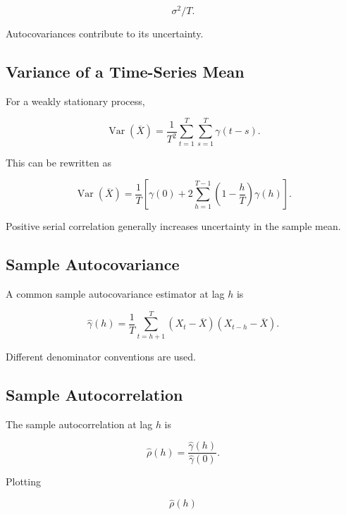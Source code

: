 \[
\sigma^2/T.
\]

Autocovariances contribute to its uncertainty.

\subsection{Variance of a Time-Series Mean}
\label{subsec:variance-time-series-mean}

For a weakly stationary process,

\[
\operatorname{Var}
(
\overline{X}
)
=
\frac1{T^2}
\sum_{t=1}^{T}
\sum_{s=1}^{T}
\gamma(t-s).
\]

This can be rewritten as

\[
\boxed{
\operatorname{Var}
(
\overline{X}
)
=
\frac1T
\left[
\gamma(0)
+
2
\sum_{h=1}^{T-1}
\left(
1-\frac{h}{T}
\right)
\gamma(h)
\right].
}
\]

Positive serial correlation generally increases uncertainty in the sample
mean.

\subsection{Sample Autocovariance}
\label{subsec:sample-autocovariance}

A common sample autocovariance estimator at lag \(h\) is

\[
\boxed{
\widehat{\gamma}(h)
=
\frac1T
\sum_{t=h+1}^{T}
(
X_t-\overline{X}
)
(
X_{t-h}-\overline{X}
).
}
\]

Different denominator conventions are used.

\subsection{Sample Autocorrelation}
\label{subsec:sample-autocorrelation}

The sample autocorrelation at lag \(h\) is

\[
\boxed{
\widehat{\rho}(h)
=
\frac{
\widehat{\gamma}(h)
}{
\widehat{\gamma}(0)
}.
}
\]

Plotting

\[
\widehat{\rho}(h)
\]

